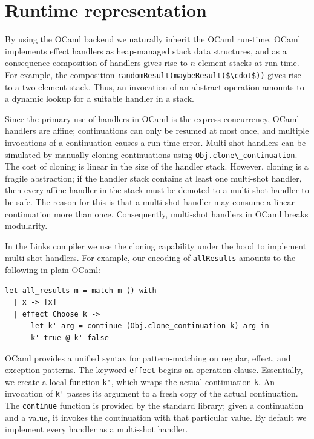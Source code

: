 \documentclass[preprint,numbers]{sigplanconf}
\newcommand{\msgbox}[2]{{%
  \par\noindent\small\color{red}%
  \framebox{\parbox{\dimexpr\linewidth-2\fboxsep-2\fboxrule}{\textbf{#1:} #2}}%
}}
\newcommand{\kc}[1]{\msgbox{KC}{#1}}
\begin{document}

\section{Runtime representation}
By using the OCaml backend we naturally inherit the OCaml run-time. OCaml
implements effect handlers as heap-managed stack data structures, and as a
consequence composition of handlers gives rise to $n$-element stacks at
run-time. For example, the composition
\lstinline[mathescape]!randomResult(maybeResult($\cdot$))! gives rise to a
two-element stack. Thus, an invocation of an abstract operation amounts to a
dynamic lookup for a suitable handler in a stack.

Since the primary use of handlers in OCaml is the express concurrency, OCaml
handlers are affine; continuations can only be resumed at most once, and
multiple invocations of a continuation causes a run-time error. Multi-shot
handlers can be simulated by manually cloning continuations using
\lstinline$Obj.clone\_continuation$. The cost of cloning is linear in the size
of the handler stack. However, cloning is a fragile abstraction; if the handler
stack contains at least one multi-shot handler, then every affine handler in
the stack must be demoted to a multi-shot handler to be safe. The reason for
this is that a multi-shot handler may consume a linear continuation more than
once. Consequently, multi-shot handlers in OCaml breaks modularity.

In the Links compiler we use the cloning capability under the hood to implement
multi-shot handlers. For example, our encoding of \lstinline$allResults$
amounts to the following in plain OCaml:
\begin{lstlisting}[style=ocaml]
let all_results m = match m () with
  | x -> [x]
  | effect Choose k ->
      let k' arg = continue (Obj.clone_continuation k) arg in
      k' true @ k' false
\end{lstlisting}
OCaml provides a unified syntax for pattern-matching on regular, effect, and
exception patterns. The keyword \lstinline[style=ocaml]$effect$ begins an
operation-clause. Essentially, we create a local function \lstinline$k'$, which
wraps the actual continuation \lstinline$k$. An invocation of \lstinline$k'$
passes its argument to a fresh copy of the actual continuation. The
\lstinline$continue$ function is provided by the standard library; given a
continuation and a value, it invokes the continuation with that particular
value. By default we implement every handler as a multi-shot handler.
\end{document}

